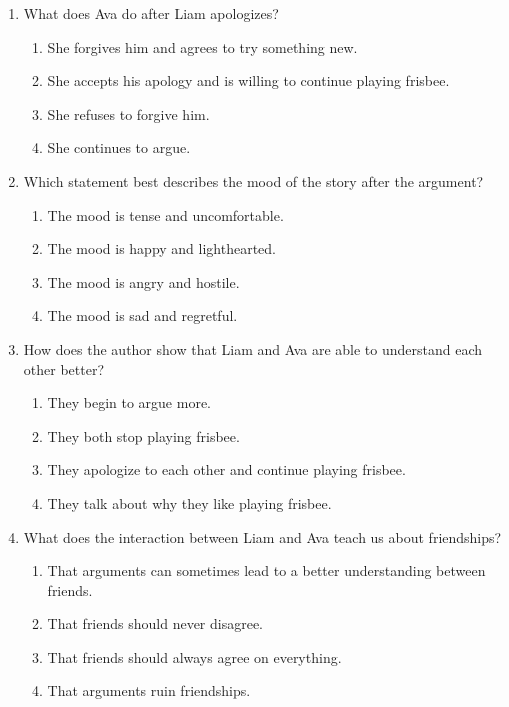 \documentclass[12pt]{article}
\begin{document}
\begin{enumerate}
    \item What does Ava do after Liam apologizes?
    \begin{enumerate}[label=\Alph*.]
        \item She forgives him and agrees to try something new.
        \item She accepts his apology and is willing to continue playing frisbee.
        \item She refuses to forgive him.
        \item She continues to argue.
    \end{enumerate}
    \vspace{0.5cm}

    \item Which statement best describes the mood of the story after the argument?
    \begin{enumerate}[label=\Alph*.]
        \item The mood is tense and uncomfortable.
        \item The mood is happy and lighthearted.
        \item The mood is angry and hostile.
        \item The mood is sad and regretful.
    \end{enumerate}
    \vspace{0.5cm}

    \item How does the author show that Liam and Ava are able to understand each other better?
    \begin{enumerate}[label=\Alph*.]
        \item They begin to argue more.
        \item They both stop playing frisbee.
        \item They apologize to each other and continue playing frisbee.
        \item They talk about why they like playing frisbee.
    \end{enumerate}
    \vspace{0.5cm}

    \item What does the interaction between Liam and Ava teach us about friendships?
    \begin{enumerate}[label=\Alph*.]
        \item That arguments can sometimes lead to a better understanding between friends.
        \item That friends should never disagree.
        \item That friends should always agree on everything.
        \item That arguments ruin friendships.
    \end{enumerate}
    \vspace{0.5cm}


\end{enumerate}
\end{document}
